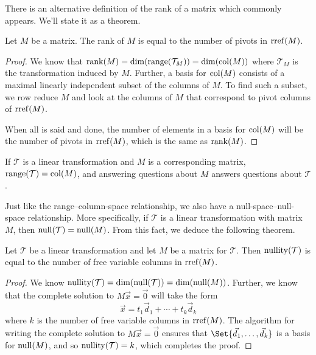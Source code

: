 There is an alternative definition of the rank of a matrix which commonly appears.
We'll state it as a theorem.

\begin{theorem}
	Let $M$ be a matrix. The rank of $M$ is equal to the number
	of pivots in $\operatorname{rref}(M)$.
\end{theorem}
\begin{proof}
	We know that $\operatorname{rank}(M)=\operatorname{dim}(\operatorname{range}(\mathcal T_M))=\operatorname{dim}(\operatorname{col}(M))$ where $\mathcal T_M$ is the transformation
	induced by $M$. Further, a basis for $\operatorname{col}(M)$ consists of a maximal linearly independent subset
	of the columns of $M$. To find such a subset, we row reduce $M$ and look at the columns of $M$ that correspond
	to pivot columns of $\operatorname{rref}(M)$.

	When all is said and done, the number of elements in a basis for $\operatorname{col}(M)$ will be the number of pivots in $\operatorname{rref}(M)$,
	which is the same as $\operatorname{rank}(M)$.
\end{proof}

\begin{emphbox}[Takeaway]
	If $\mathcal T$ is a linear transformation and $M$ is a corresponding
	matrix, $\operatorname{range}(\mathcal T)=\operatorname{col}(M)$, and answering questions about $M$ answers
	questions about $\mathcal T$.
\end{emphbox}

Just like the range--column-space relationship, we also have a null-space--null-space relationship.
More specifically, if $\mathcal T$ is a linear transformation with matrix $M$, then
$\operatorname{null}(\mathcal T)=\operatorname{null}(M)$. From this fact, we deduce the following theorem.

\begin{theorem}
	Let $\mathcal T$ be a linear transformation and let $M$ be a matrix for $\mathcal T$. Then
	$\operatorname{nullity}(\mathcal T)$ is equal to the number of free variable columns in $\operatorname{rref}(M)$.
\end{theorem}
\begin{proof}
	We know $\operatorname{nullity}(\mathcal T)=\operatorname{dim}(\operatorname{null}(\mathcal T))=\operatorname{dim}(\operatorname{null}(M))$. Further, we know
	that the complete solution to $M\vec x=\vec 0$ will take the form
	\[
		\vec x=t_1\vec d_1+\cdots +t_k\vec d_k
	\]
	where $k$ is the number of free variable columns in $\operatorname{rref}(M)$. The algorithm for
	writing the complete solution to $M\vec x=\vec 0$ ensures that $\Set{\vec d_1,\ldots,\vec d_k}$
	is a basis for $\operatorname{null}(M)$, and so $\operatorname{nullity}(\mathcal T)=k$, which completes the proof.
\end{proof}

